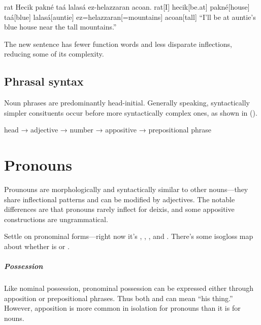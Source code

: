 \begin{gloss*}
    \begingl
        \glpreamble rat Hecik pakné taá lalasá ez-helazzaran acoan. \endpreamble
        rat[I]
        hecik[be.at]
        pakné[house\tbs{}]
        taá[blue\tbs{}]
        lalasá[auntie\tbs{}]
        ez=helazzaran[=mountains]
        acoan[tall]
        \glft “I'll be at auntie's blue house near the tall mountains.”
    \endgl
\end{gloss*}

The new sentence has fewer function words and less disparate inflections, reducing some of its complexity.

\section{Phrasal syntax}
Noun phrases are predominantly head-initial. Generally speaking, syntactically simpler consituents occur before more syntactically complex ones, as shown in (\nextx).

\begin{gloss}
    head → adjective → number → appositive → prepositional phrase
\end{gloss}

\setchapterpreamble[u]{\margintoc}
\chapter{Pronouns}
Prounouns are morphologically and syntactically similar to other nouns---they share inflectional patterns and can be modified by adjectives. The notable differences are that pronouns rarely inflect for deixis, and some appositive constructions are ungrammatical.

\begin{kaobox}[frametitle=\sc todo:]
Settle on pronominal forms---right now it's  ,  ,  , and  . There's some isogloss map about whether  is  or .
\end{kaobox}

\paragraph{Possession}
Like nominal possession, pronominal possession can be expressed either through apposition or prepositional phrases.  Thus both  and  can mean “his thing.” However, apposition is more common in isolation for pronouns than it is for nouns.